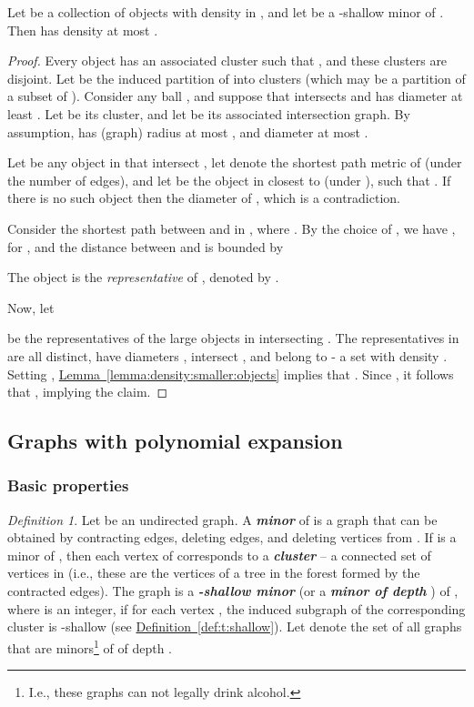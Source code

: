 \documentclass[12pt]{article}
\newcommand{\emphic}[2]{\textcolor{blue25}{\textbf{\emph{#1}}}\index{#2}}
\renewcommand{\emphic}[2]{\textbf{\emph{#1}}}
\newcommand{\emphi}[1]{\emphic{#1}{#1}}
\theoremstyle{remark}\theoremheaderfont{\sf}\theorembodyfont{\upshape}
\newtheorem{defn}[theorem]{Definition}
\numberwithin{figure}{section}\numberwithin{table}{section}\numberwithin{equation}{section}
\newcommand{\HLink}[2]{\hyperref[#2]{#1~\ref*{#2}}}
\newcommand{\HLinkPage}[2]{\hyperref[#2]{#1~\ref*{#2}}}
\newcommand{\seclab}[1]{\label{sec:#1}} \newcommand{\secref}[1]{\HLink{Section}{sec:#1}} \newcommand{\secrefpage}[1]{\HLinkPage{Section}{sec:#1}}
\providecommand{\deflab}[1]{\label{def:#1}}
\newcommand{\defref}[1]{\HLink{Definition}{def:#1}}
\newcommand{\lemlab}[1]{\label{lemma:#1}}
\newcommand{\lemref}[1]{\HLink{Lemma}{lemma:#1}}
\begin{document}
\begin{lemma}\lemlab{density:shallow:minors}Let  be a collection of objects with density  in
  , and let  be a -shallow minor of
  . Then  has density at most
  .
\end{lemma}
\begin{proof}
  Every object  has an associated cluster
   such that
  , and these
  clusters are disjoint.  Let
   be the
  induced partition of  into clusters (which may be a
  partition of a subset of ). Consider any ball
  , and suppose that 
  intersects  and has diameter at least . Let
   be its cluster, and let
   be its associated intersection
  graph.  By assumption,  has (graph) radius at most , and
  diameter at most .

  Let  be any object in  that intersect
  , let  denote the shortest path metric
  of  (under the number of edges), and let  be the
  object in  closest to  (under
  ), such that . If
  there is no such object then the diameter of
  , which is a contradiction.

  Consider the shortest path 
  between  and  in , where
  .  By the choice of , we have ,
  for , and the distance between  and 
  is bounded by
  
  The object  is the \emph{representative} of , denoted
  by .

  Now, let
  
  be the representatives of the large objects in 
  intersecting .  The representatives in  are all
  distinct, have diameters , intersect ,
  and belong to  - a set with density .  Setting
  , \lemref{density:smaller:objects} implies that
  .  Since
   \cite{v-cbseb-05}, it follows that
  , implying the claim.
\end{proof}


\subsection{Graphs with polynomial expansion}
\seclab{poly-expansion} 

\subsubsection{Basic properties}

\begin{defn}
  \deflab{shallow:minor}Let  be an undirected graph. A \emphi{minor} of  is
  a graph  that can be obtained by contracting edges,
  deleting edges, and deleting vertices from . If  is
  a minor of , then each vertex  of  corresponds
  to a \emphi{cluster} -- a connected set  of vertices
  in  (i.e., these are the vertices of a tree in the forest
  formed by the contracted edges).  The graph  is a
  \emphi{-shallow minor} (or a \emphi{minor of depth }) of
  , where  is an integer, if for each vertex
  , the induced subgraph
   of the corresponding cluster
   is -shallow (see \defref{t:shallow}).
  Let  denote the set of all graphs that are
  minors\footnote{I.e., these graphs can not legally drink alcohol.}
  of  of depth .
\end{defn}
\end{document}
